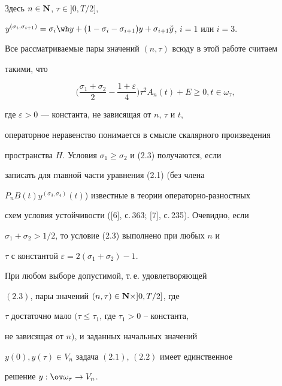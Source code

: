 Здесь $n\in{\bold N}$, $\tau\in]0,T/2]$,


$y^{(\sigma_i,\sigma_{i+1})}=\sigma_i\wh y+(1-\sigma_i-\sigma_{i+1})y+


\sigma_{i+1}\check y$, $i=1$ или $i=3$.


Все рассматриваемые пары значений $(n,\tau)$ всюду в этой работе считаем


такими, что


\begin{equation}


\bigg(\frac{\sigma_1+\sigma_2}2-\frac{1+\varepsilon}4


\bigg)\tau^2A_n(t)+E\ge0, t\in\omega_\tau,


\end{equation}


где $\varepsilon>0$ --- константа, не зависящая от $n$, $\tau$ и $t$,


операторное неравенство понимается в смысле скалярного произведения


пространства $H$. Условия $\sigma_1\ge\sigma_2$ и (2.3) получаются, если


записать для главной части уравнения (2.1) (без члена


$P_nB(t)y^{(\sigma_3,\sigma_4)}(t)$) известные в теории операторно-разностных


схем условия устойчивости ([6], с.\,363; [7], с.\,235). Очевидно, если


$\sigma_1+\sigma_2>1/2$, то условие (2.3) выполнено при любых $n$ и


$\tau$ с константой $\varepsilon=2(\sigma_1+\sigma_2)-1$.





\begin{lem}


При любом выборе допустимой, т.\,е. удовлетворяющей


$(2.3)$, пары значений $(n,\tau)\in{\bold N}\times]0,T/2]$, где


$\tau$ достаточно мало $(\tau\le\tau_1$, где $\tau_1>0$ -- константа,


не зависящая от $n)$, и заданных начальных значений


$y(0), y(\tau)\in V_n$ задача $(2.1)$, $(2.2)$ имеет единственное


решение $y:\ov\omega_\tau\to V_n$.


\end{lem}





